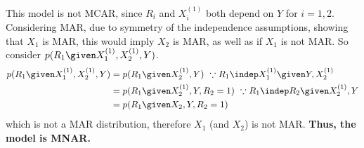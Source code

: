 This model is not MCAR, since $R_i$ and $X_i^{(1)}$ both depend on $Y$ for $i = 1,2$.
Considering MAR, due to symmetry of the independence assumptions, showing that $X_1$ is MAR, this would imply $X_2$ is MAR, as well as if $X_1$ is not MAR. So consider $p(R_1 \given X_1^{(1)}, X_2^{(1)}, Y)$. 
\begin{align*}
    p(R_1 \given X_1^{(1)}, X_2^{(1)}, Y) 
        &= p(R_1 \given X_2^{(1)}, Y) ~\because R_1 \indep X_1^{(1)} \given Y, X_2^{(1)}\\
        &= p(R_1 \given X_2^{(1)}, Y, R_2 = 1) ~\because R_1 \indep R_2 \given X_2^{(1)}, Y\\
        &= p(R_1 \given X_2, Y, R_2 = 1)
\end{align*}
which is not a MAR distribution, therefore $X_1$ (and $X_2$) is not MAR. 
\textbf{Thus, the model is MNAR.} 